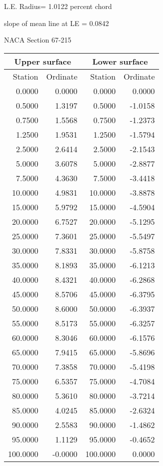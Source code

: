 \documentclass[11pt]{book}
\begin{document}
L.E. Radius=  1.0122 percent chord


 slope of mean line at LE =  0.0842
 \newpage
  \label{s67-215}
 \begin{Large}
 NACA Section 67-215
 \end{Large}
  
 \vspace{8mm}
 \begin{tabular}{|r|r|r|r|} \hline 
 \multicolumn{2}{|c|}{Upper surface} & \multicolumn{2}{|c|}{Lower surface} \\
 \hline
 Station & Ordinate & Station & Ordinate \\
 \hline
0.0000 & 0.0000 & 0.0000 & 0.0000 \\
0.5000 & 1.3197 & 0.5000 & -1.0158 \\
0.7500 & 1.5568 & 0.7500 & -1.2373 \\
1.2500 & 1.9531 & 1.2500 & -1.5794 \\
2.5000 & 2.6414 & 2.5000 & -2.1543 \\
5.0000 & 3.6078 & 5.0000 & -2.8877 \\
7.5000 & 4.3630 & 7.5000 & -3.4418 \\
10.0000 & 4.9831 & 10.0000 & -3.8878 \\
15.0000 & 5.9792 & 15.0000 & -4.5904 \\
20.0000 & 6.7527 & 20.0000 & -5.1295 \\
25.0000 & 7.3601 & 25.0000 & -5.5497 \\
30.0000 & 7.8331 & 30.0000 & -5.8758 \\
35.0000 & 8.1893 & 35.0000 & -6.1213 \\
40.0000 & 8.4321 & 40.0000 & -6.2868 \\
45.0000 & 8.5706 & 45.0000 & -6.3795 \\
50.0000 & 8.6000 & 50.0000 & -6.3937 \\
55.0000 & 8.5173 & 55.0000 & -6.3257 \\
60.0000 & 8.3046 & 60.0000 & -6.1576 \\
65.0000 & 7.9415 & 65.0000 & -5.8696 \\
70.0000 & 7.3858 & 70.0000 & -5.4198 \\
75.0000 & 6.5357 & 75.0000 & -4.7084 \\
80.0000 & 5.3610 & 80.0000 & -3.7214 \\
85.0000 & 4.0245 & 85.0000 & -2.6324 \\
90.0000 & 2.5583 & 90.0000 & -1.4862 \\
95.0000 & 1.1129 & 95.0000 & -0.4652 \\
100.0000 & -0.0000 & 100.0000 & 0.0000 \\
 \hline 
 \end{tabular}
\end{document}
